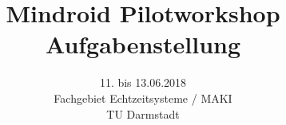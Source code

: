 	\author{}
	\title{Mindroid Pilotworkshop \\Aufgabenstellung}
	\subtitle{11. bis 13.06.2018 \\ Fachgebiet Echtzeitsysteme / MAKI \\ TU Darmstadt}
	\subsubtitle{}
	
	\maketitle	